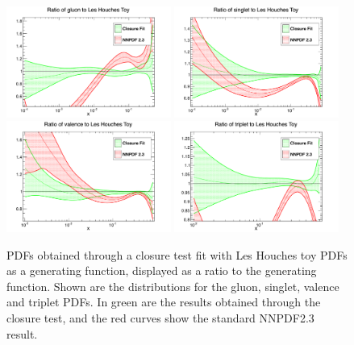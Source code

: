 \begin{figure}[ht]
\centering
\includegraphics[width=0.48\textwidth]{7-PostLHC/figs/gluon.pdf}
\includegraphics[width=0.48\textwidth]{7-PostLHC/figs/singlet.pdf}\\
\includegraphics[width=0.48\textwidth]{7-PostLHC/figs/valence.pdf}
\includegraphics[width=0.48\textwidth]{7-PostLHC/figs/triplet.pdf}
\caption[PDFs obtained through a Closure test fit with toy PDFs as a generating function]{PDFs obtained through a closure test fit with Les Houches toy PDFs as a generating function, displayed as a ratio to the generating function. Shown are the distributions for the gluon, singlet, valence and triplet PDFs. In green are the results obtained through the closure test, and the red curves show the standard NNPDF2.3 result.}
\label{fig:LHtoyclosure1}
\end{figure}

